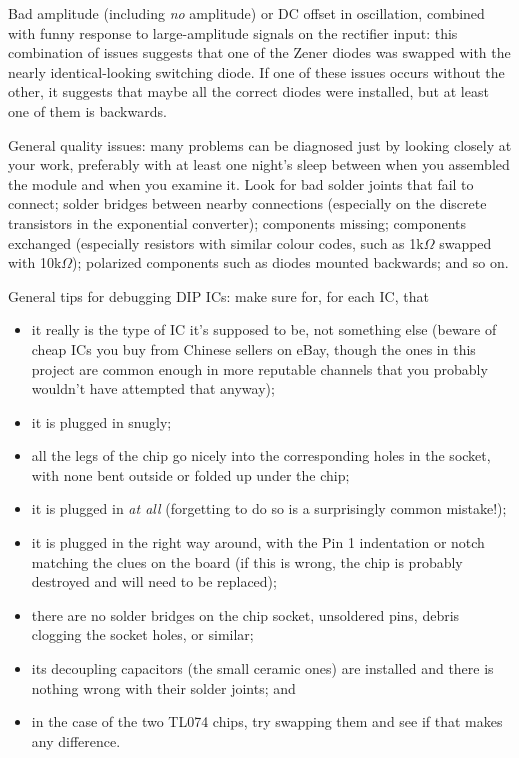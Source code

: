 Bad amplitude (including \emph{no} amplitude) or DC offset in oscillation,
combined with funny response to large-amplitude signals on the rectifier
input: this combination of issues suggests that one of the Zener diodes was
swapped with the nearly identical-looking switching diode.  If one of these
issues occurs without the other, it suggests that maybe all the correct
diodes were installed, but at least one of them is backwards.

General quality issues:  many problems can be diagnosed just by looking
closely at your work, preferably with at least one night's sleep between
when you assembled the module and when you examine it.  Look for bad solder
joints that fail to connect; solder bridges between nearby connections
(especially on the discrete transistors in the exponential converter);
components missing; components exchanged (especially resistors with similar
colour codes, such as 1k$\Omega$ swapped with 10k$\Omega$); polarized
components such as diodes mounted backwards; and so on.

General tips for debugging DIP ICs:  make sure for, for each IC, that
\begin{itemize}
  \item it really is the type of IC it's supposed to be, not something else
    (beware of cheap ICs you buy from Chinese sellers on eBay, though the
    ones in this project are common enough in more reputable channels that
    you probably wouldn't have attempted that anyway);
  \item it is plugged in snugly;
  \item all the legs of the chip go nicely into the corresponding holes in
    the socket, with none bent outside or folded up under the chip;
  \item it is plugged in \emph{at all} (forgetting to do so is a surprisingly
    common mistake!);
  \item it is plugged in the right way around, with the Pin 1
    indentation or notch matching the clues on the
    board (if this is wrong, the chip is probably destroyed and will need to
    be replaced);
  \item there are no solder bridges on the chip socket, unsoldered pins,
    debris clogging the socket holes, or similar;
  \item its decoupling capacitors (the small ceramic ones) are installed and
    there is nothing wrong with their solder joints; and
  \item in the case of the two TL074 chips, try swapping them and see if that
    makes any difference.
\end{itemize}
